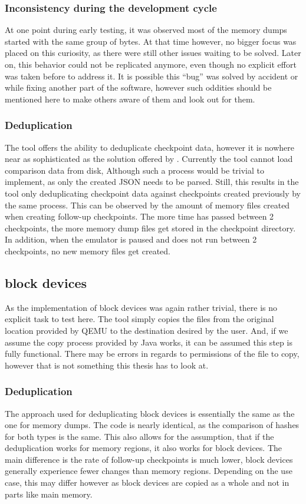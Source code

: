 \subsubsection*{Inconsistency during the development cycle}
At one point during early testing,
it was observed most of the memory dumps started with the same group of bytes.
At that time however, no bigger focus was placed on this curiosity,
as there were still other issues waiting to be solved.
Later on, this behavior could not be replicated anymore,
even though no explicit effort was taken before to address it.
It is possible this \enquote{bug} was solved by accident
or while fixing another part of the software,
however such oddities should be mentioned here to make others aware of them and look out for them.

\subsubsection*{Deduplication}
The tool offers the ability to deduplicate checkpoint data,
however it is nowhere near as sophisticated as the solution offered by \citeauthor{kitcheckpoints}.
Currently the tool cannot load comparison data from disk,
Although such a process would be trivial to implement,
as only the created JSON needs to be parsed.
Still, this results in the tool only deduplicating checkpoint data
against checkpoints created previously by the same process.
This can be observed by the amount of memory files created
when creating follow-up checkpoints.
The more time has passed between 2 checkpoints,
the more memory dump files get stored in the checkpoint directory.
In addition, when the emulator is paused and does not run between 2 checkpoints, no new memory files get created.

\subsection{block devices}
As the implementation of block devices was again rather trivial,
there is no explicit task to test here.
The tool simply copies the files from the original location provided by QEMU
to the destination desired by the user.
And, if we assume the copy process provided by Java works,
it can be assumed this step is fully functional.
There may be errors in regards to permissions of the file to copy,
however that is not something this thesis has to look at.

\subsubsection*{Deduplication}
The approach used for deduplicating block devices is essentially the same as the one for memory dumps.
The code is nearly identical, as the comparison of hashes for both types is the same.
This also allows for the assumption, that if the deduplication works for memory regions,
it also works for block devices.
The main difference is the rate of follow-up checkpoints is much lower,
block devices generally experience fewer changes than memory regions.
Depending on the use case, this may differ however as block devices are copied as a whole and not in parts like main memory.

